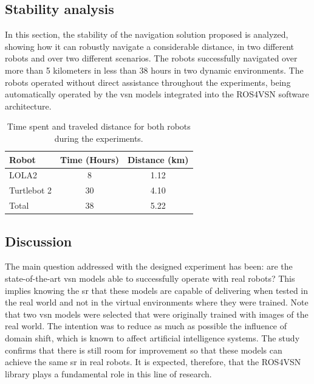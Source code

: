 \subsection{Stability analysis}
\label{subsec:marathon}

In this section, the stability of the navigation solution proposed is analyzed, showing how it can robustly navigate a considerable distance, in two different robots and over two different scenarios.
The robots successfully navigated over more than 5 kilometers in less than 38 hours in two dynamic environments.
The robots operated without direct assistance throughout the experiments, being automatically operated by the \acrshort{vsn} models integrated into the ROS4VSN software architecture.

\begin{table}
    \centering
    \begin{tabular}{l|cc}
        \toprule
        \textbf{Robot} & Time (Hours) & Distance (km) \\
        \midrule
        LOLA2       & 8     & 1.12 \\
        Turtlebot 2 & 30    & 4.10 \\\midrule
        Total       & 38    & 5.22 \\
        \bottomrule
    \end{tabular}
    \caption{Time spent and traveled distance for both robots during the experiments.}
    \label{tab:stability}
\end{table}

\subsection{Discussion}
\label{subsec:discussion}
The main question addressed with the designed experiment has been: are the state-of-the-art \acrshort{vsn} models able to successfully operate with real robots?
This implies knowing the \acrshort{sr} that these models are capable of delivering when tested in the real world and not in the virtual environments where they were trained.
Note that two \acrshort{vsn} models were selected that were originally trained with images of the real world.
The intention was to reduce as much as possible the influence of domain shift, which is known to affect artificial intelligence systems.
The study confirms that there is still room for improvement so that these models can achieve the same \acrshort{sr} in real robots.
It is expected, therefore, that the ROS4VSN library plays a fundamental role in this line of research.

